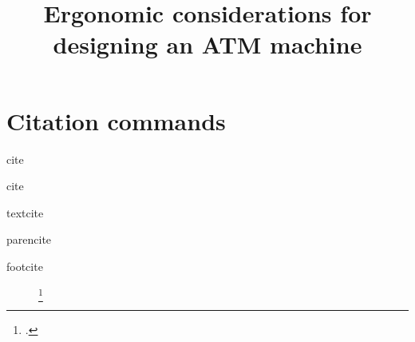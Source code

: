 \documentclass[
  nobib,
  justified,
  english,
  a4paper,
  marginals=raggedright
]{tufte-handout}
\title{Ergonomic considerations for designing an ATM machine}
\date{}
\begin{document}
\maketitle

\Blindtext 

\section{Citation commands}

\begin{description}
  \item[cite] 
    \cite{Zimmermann2000a}
  \item[cite] 
    \cite{apple}
  \item[textcite] 
    \textcite{Zimmermann2000a}
  \item[parencite] 
    \parencite{Zimmermann2000a}
  \item[footcite] 
    \footcite{Zimmermann2000a}
\end{description}

\printbibliography

\end{document}
